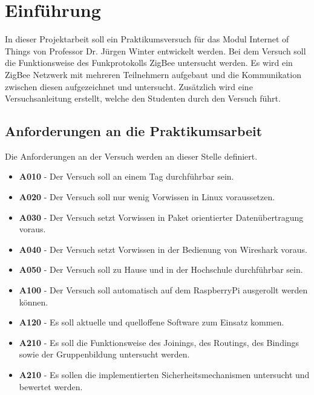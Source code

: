 \chapter{Einführung}

In dieser Projektarbeit soll ein Praktikumsversuch für das Modul \grqq Internet of Things\grqq{} von Professor Dr. Jürgen Winter 
entwickelt werden. Bei dem Versuch soll die Funktionsweise des Funkprotokolls ZigBee untersucht werden. Es wird ein 
ZigBee Netzwerk mit mehreren Teilnehmern aufgebaut und die Kommunikation zwischen diesen aufgezeichnet und untersucht. 
Zusätzlich wird eine Versuchsanleitung erstellt, welche den Studenten durch den Versuch führt.

\section{Anforderungen an die Praktikumsarbeit}

Die Anforderungen an der Versuch werden an dieser Stelle definiert.
\begin{itemize}
    \item \textbf{A010} - Der Versuch soll an einem Tag durchführbar sein.
    \item \textbf{A020} - Der Versuch soll nur wenig Vorwissen in Linux voraussetzen.
    \item \textbf{A030} - Der Versuch setzt Vorwissen in Paket orientierter Datenübertragung voraus.
    \item \textbf{A040} - Der Versuch setzt Vorwissen in der Bedienung von Wireshark voraus.
    \item \textbf{A050} - Der Versuch soll zu Hause und in der Hochschule durchführbar sein.
    \item \textbf{A100} - Der Versuch soll automatisch auf dem RaspberryPi ausgerollt werden können.
    \item \textbf{A120} - Es soll aktuelle und quelloffene Software zum Einsatz kommen.
    \item \textbf{A210} - Es soll die Funktionsweise des Joinings, des Routings, des Bindings sowie der Gruppenbildung untersucht werden.
    \item \textbf{A210} - Es sollen die implementierten Sicherheitsmechanismen untersucht und bewertet werden.
\end{itemize}

